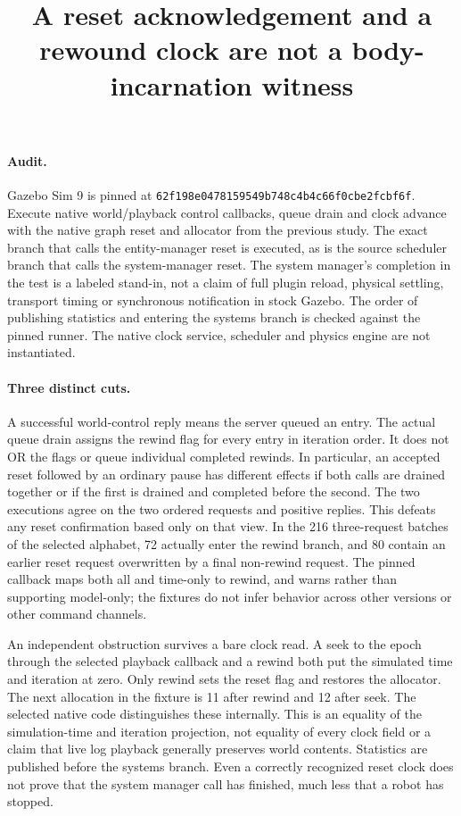 \documentclass{article}
\begin{document}
\title{A reset acknowledgement and a rewound clock are not a body-incarnation witness}
\maketitle

\paragraph{Audit.}
Gazebo Sim 9 is pinned at
\texttt{62f198e0478159549b748c4b4c66f0cbe2fcbf6f}.
Execute native world/playback control callbacks, queue drain and clock
advance with the native graph reset and allocator from the previous study.
The exact branch that calls the entity-manager reset is executed, as
is the source scheduler branch that calls the system-manager reset.
The system manager's completion in the test is a labeled stand-in,
not a claim of full plugin reload, physical settling, transport timing
or synchronous notification in stock Gazebo. The order of publishing
statistics and entering the systems branch is checked against the
pinned runner. The native clock service, scheduler and physics engine
are not instantiated.

\paragraph{Three distinct cuts.}
A successful world-control reply means the server queued an entry.
The actual queue drain assigns the rewind flag for every entry in
iteration order. It does not OR the flags or queue individual completed
rewinds. In particular, an accepted reset followed by an ordinary pause
has different effects if both calls are drained together or if the first
is drained and completed before the second. The two executions agree on
the two ordered requests and positive replies. This defeats any reset
confirmation based only on that view. In the 216 three-request batches
of the selected alphabet, 72 actually enter the rewind branch, and
80 contain an earlier reset request overwritten by a final non-rewind
request. The pinned callback maps both all and time-only to rewind, and
warns rather than supporting model-only; the fixtures do not infer
behavior across other versions or other command channels.

An independent obstruction survives a bare clock read. A seek to the
epoch through the selected playback callback and a rewind both put
the simulated time and iteration at zero. Only rewind sets the reset
flag and restores the allocator. The next allocation in the fixture is
11 after rewind and 12 after seek. The selected native code distinguishes
these internally. This is an equality of the simulation-time and
iteration projection, not equality of every clock field or a claim
that live log playback generally preserves world contents.
Statistics are published before the systems branch. Even a correctly
recognized reset clock does not prove that the system manager call
has finished, much less that a robot has stopped.
\end{document}
